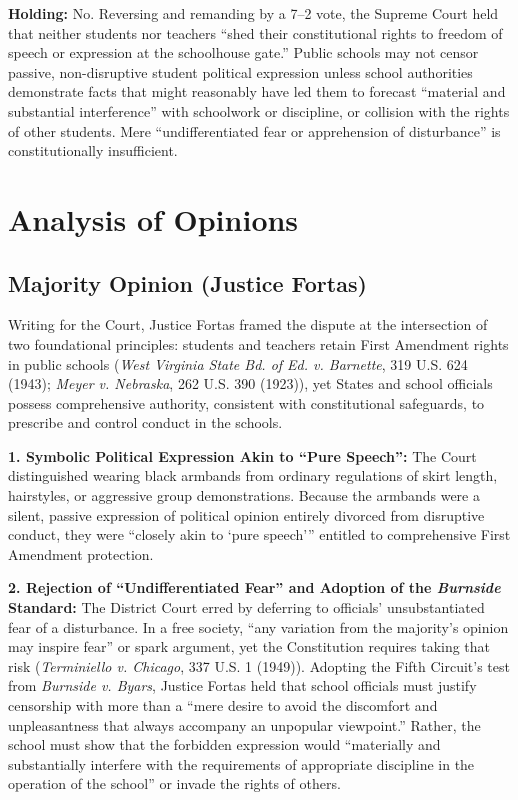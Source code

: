 \documentclass[12pt]{article}
\begin{document}
\textbf{Holding:} No. Reversing and remanding by a 7--2 vote, the Supreme Court held that neither students nor teachers ``shed their constitutional rights to freedom of speech or expression at the schoolhouse gate.'' Public schools may not censor passive, non-disruptive student political expression unless school authorities demonstrate facts that might reasonably have led them to forecast ``material and substantial interference'' with schoolwork or discipline, or collision with the rights of other students. Mere ``undifferentiated fear or apprehension of disturbance'' is constitutionally insufficient.

\section{Analysis of Opinions}
\subsection{Majority Opinion (Justice Fortas)}

Writing for the Court, Justice Fortas framed the dispute at the intersection of two foundational principles: students and teachers retain First Amendment rights in public schools (\textit{West Virginia State Bd. of Ed. v. Barnette}, 319 U.S. 624 (1943); \textit{Meyer v. Nebraska}, 262 U.S. 390 (1923)), yet States and school officials possess comprehensive authority, consistent with constitutional safeguards, to prescribe and control conduct in the schools.

\textbf{1. Symbolic Political Expression Akin to ``Pure Speech'':} The Court distinguished wearing black armbands from ordinary regulations of skirt length, hairstyles, or aggressive group demonstrations. Because the armbands were a silent, passive expression of political opinion entirely divorced from disruptive conduct, they were ``closely akin to `pure speech''' entitled to comprehensive First Amendment protection.

\textbf{2. Rejection of ``Undifferentiated Fear'' and Adoption of the \textit{Burnside} Standard:} The District Court erred by deferring to officials' unsubstantiated fear of a disturbance. In a free society, ``any variation from the majority's opinion may inspire fear'' or spark argument, yet the Constitution requires taking that risk (\textit{Terminiello v. Chicago}, 337 U.S. 1 (1949)). Adopting the Fifth Circuit's test from \textit{Burnside v. Byars}, Justice Fortas held that school officials must justify censorship with more than a ``mere desire to avoid the discomfort and unpleasantness that always accompany an unpopular viewpoint.'' Rather, the school must show that the forbidden expression would ``materially and substantially interfere with the requirements of appropriate discipline in the operation of the school'' or invade the rights of others.
\end{document}
